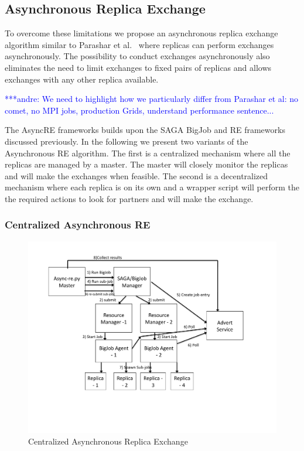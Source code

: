 \documentclass[a4paper,10pt]{article}
\newcommand{\alnote}[1]{ {\textcolor{blue} { ***andre: #1 }}}
\newcommand{\alnote}[1]{}
\begin{document}
\subsection{Asynchronous Replica Exchange}

To overcome these limitations we propose an asynchronous replica
exchange algorithm similar to Parashar et al.~\cite{parashar_arepex}
where replicas can perform exchanges asynchronously. The possibility
to conduct exchanges asynchronously also eliminates the need to limit
exchanges to fixed pairs of replicas and allows exchanges with any
other replica available.
 
\alnote{We need to highlight how we particularly differ from Parashar
  et al: no comet, no MPI jobs, production Grids, understand
  performance sentence...}

The AsyncRE frameworks builds upon the SAGA BigJob and RE frameworks
discussed previously.  In the following we present two variants of the
Asynchronous RE algorithm. The first is a centralized mechanism where
all the replicas are managed by a master. The master will closely
monitor the replicas and will make the exchanges when feasible.  The
second is a decentralized mechanism where each replica is on its own
and a wrapper script will perform the the required actions to look for
partners and will make the exchange.



\subsubsection{Centralized Asynchronous RE}

\begin{figure}
\centering
\includegraphics[scale=0.50]{figures/centralized_architecture}
\caption{\small Centralized Asynchronous Replica Exchange}
\label{fig:centralized}
\end{figure}
\end{document}
